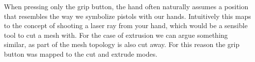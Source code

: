 When pressing only the grip button, the hand often naturally assumes a position that resembles the way we symbolize pistols with our hands. Intuitively this maps to the concept of shooting a laser ray from your hand, which would be a sensible tool to cut a mesh with. For the case of extrusion we can argue something similar, as part of the mesh topology is also cut away. For this reason the grip button was mapped to the cut and extrude modes.